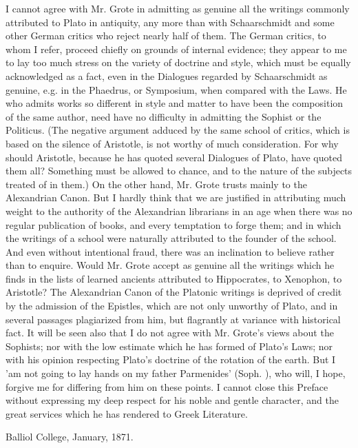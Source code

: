 \documentclass[11pt,letter]{article}
\begin{document}
\par  I cannot agree with Mr. Grote in admitting as genuine all the writings commonly attributed to Plato in antiquity, any more than with Schaarschmidt and some other German critics who reject nearly half of them. The German critics, to whom I refer, proceed chiefly on grounds of internal evidence; they appear to me to lay too much stress on the variety of doctrine and style, which must be equally acknowledged as a fact, even in the Dialogues regarded by Schaarschmidt as genuine, e.g. in the Phaedrus, or Symposium, when compared with the Laws. He who admits works so different in style and matter to have been the composition of the same author, need have no difficulty in admitting the Sophist or the Politicus. (The negative argument adduced by the same school of critics, which is based on the silence of Aristotle, is not worthy of much consideration. For why should Aristotle, because he has quoted several Dialogues of Plato, have quoted them all? Something must be allowed to chance, and to the nature of the subjects treated of in them.) On the other hand, Mr. Grote trusts mainly to the Alexandrian Canon. But I hardly think that we are justified in attributing much weight to the authority of the Alexandrian librarians in an age when there was no regular publication of books, and every temptation to forge them; and in which the writings of a school were naturally attributed to the founder of the school. And even without intentional fraud, there was an inclination to believe rather than to enquire. Would Mr. Grote accept as genuine all the writings which he finds in the lists of learned ancients attributed to Hippocrates, to Xenophon, to Aristotle? The Alexandrian Canon of the Platonic writings is deprived of credit by the admission of the Epistles, which are not only unworthy of Plato, and in several passages plagiarized from him, but flagrantly at variance with historical fact. It will be seen also that I do not agree with Mr. Grote's views about the Sophists; nor with the low estimate which he has formed of Plato's Laws; nor with his opinion respecting Plato's doctrine of the rotation of the earth. But I 'am not going to lay hands on my father Parmenides' (Soph. ), who will, I hope, forgive me for differing from him on these points. I cannot close this Preface without expressing my deep respect for his noble and gentle character, and the great services which he has rendered to Greek Literature.

\par  Balliol College, January, 1871.
\end{document}

